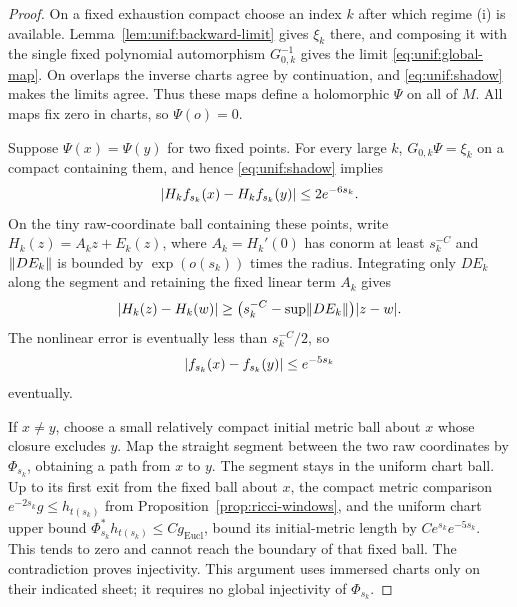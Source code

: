 \begin{proof}
On a fixed exhaustion compact choose an index $k$ after which regime
(i) is available.  Lemma~\ref{lem:unif:backward-limit} gives $\xi_k$
there, and composing it with the single fixed polynomial
automorphism $G_{0,k}^{-1}$ gives the limit
\eqref{eq:unif:global-map}.  On overlaps the inverse charts agree by
continuation, and \eqref{eq:unif:shadow} makes the limits agree.
Thus these maps define a holomorphic $\Psi$ on all of $M$.  All maps
fix zero in charts, so $\Psi(o)=0$.

Suppose $\Psi(x)=\Psi(y)$ for two fixed points.  For every large $k$,
$G_{0,k}\Psi=\xi_k$ on a compact containing them, and hence
\eqref{eq:unif:shadow} implies
\[
 \lvert H_kf_{s_k}(x)-H_kf_{s_k}(y)\rvert\le2e^{-6s_k}.
\]
On the tiny raw-coordinate ball containing these points, write
$H_k(z)=A_kz+E_k(z)$, where $A_k=H_k'(0)$ has conorm at least
$s_k^{-C}$ and $\lVert DE_k\rVert$ is bounded by $\exp(o(s_k))$ times
the radius.  Integrating only $DE_k$ along the segment and retaining
the fixed linear term $A_k$ gives
\[
 |H_k(z)-H_k(w)|\ge
 \bigl(s_k^{-C}-\sup\lVert DE_k\rVert\bigr)|z-w|.
\]
The nonlinear error is eventually less than $s_k^{-C}/2$, so
\begin{equation}
 \lvert f_{s_k}(x)-f_{s_k}(y)\rvert\le e^{-5s_k}
 \label{eq:unif:raw-separation}
\end{equation}
eventually.

If $x\ne y$, choose a small relatively compact initial metric ball
about $x$ whose closure excludes $y$.  Map the straight segment
between the two raw coordinates by $\Phi_{s_k}$, obtaining a path
from $x$ to $y$.  The segment stays in the uniform chart ball.
Up to its first exit from the fixed ball about $x$, the compact
metric comparison $e^{-2s_k}g\le h_{t(s_k)}$ from
Proposition~\ref{prop:ricci-windows}, and the uniform chart upper
bound $\Phi_{s_k}^*h_{t(s_k)}\le Cg_{\mathrm{Eucl}}$, bound its
initial-metric length by
$Ce^{s_k}e^{-5s_k}$.  This tends to zero and cannot reach the
boundary of that fixed ball.  The contradiction proves injectivity.
This argument uses immersed charts only on their indicated sheet;
it requires no global injectivity of $\Phi_{s_k}$.


\end{proof}
